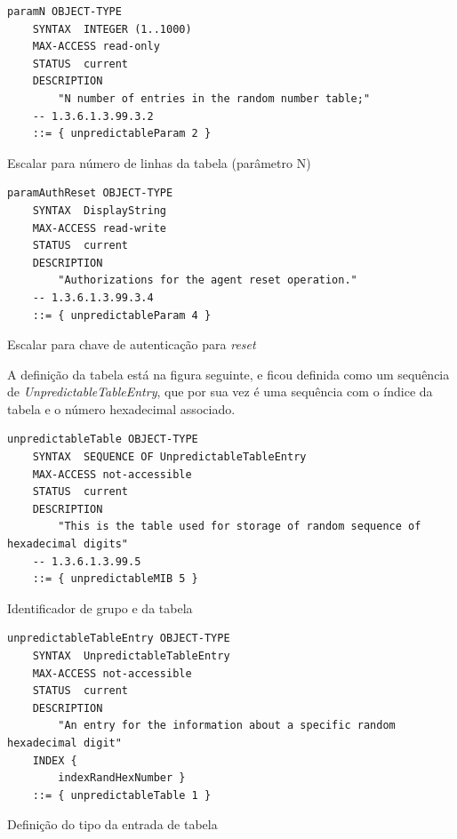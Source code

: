 \begin{center}
 	
\begin{verbatim}
paramN OBJECT-TYPE
	SYNTAX  INTEGER (1..1000)
	MAX-ACCESS read-only
	STATUS  current
	DESCRIPTION
		"N number of entries in the random number table;"
	-- 1.3.6.1.3.99.3.2
	::= { unpredictableParam 2 }

\end{verbatim}
 	\captionsetup{type=figure, width=0.8\linewidth}
	\caption{Escalar para número de linhas da tabela (parâmetro N)}
\label{fig:fasea:} 
\end{center}
\newpage
\begin{center}
 	
\begin{verbatim}
paramAuthReset OBJECT-TYPE
	SYNTAX  DisplayString
	MAX-ACCESS read-write
	STATUS  current
	DESCRIPTION
		"Authorizations for the agent reset operation."
	-- 1.3.6.1.3.99.3.4
	::= { unpredictableParam 4 }

\end{verbatim}
 	\captionsetup{type=figure, width=0.8\linewidth}
	\caption{Escalar para chave de autenticação para \emph{reset} }
\label{fig:fasea:} 
\end{center}

\newpage
A definição da tabela está na figura seguinte, e ficou definida como um
sequência de \emph{UnpredictableTableEntry}, que por sua vez é uma sequência
com o índice da tabela e o número hexadecimal associado. 

\begin{center}
 	
\begin{verbatim}
unpredictableTable OBJECT-TYPE
	SYNTAX  SEQUENCE OF UnpredictableTableEntry
	MAX-ACCESS not-accessible
	STATUS  current
	DESCRIPTION
		"This is the table used for storage of random sequence of hexadecimal digits"
	-- 1.3.6.1.3.99.5
	::= { unpredictableMIB 5 }
\end{verbatim}
 	\captionsetup{type=figure, width=0.8\linewidth}
	\caption{Identificador de grupo e da tabela}
\label{fig:fasea:} 
\end{center}

\begin{center}
 	
\begin{verbatim}
unpredictableTableEntry OBJECT-TYPE
	SYNTAX  UnpredictableTableEntry
	MAX-ACCESS not-accessible
	STATUS  current
	DESCRIPTION
		"An entry for the information about a specific random hexadecimal digit"
	INDEX {
		indexRandHexNumber }
	::= { unpredictableTable 1 }

\end{verbatim}
 	\captionsetup{type=figure, width=0.8\linewidth}
	\caption{Definição do tipo da entrada de tabela}
\label{fig:fasea:} 
\end{center}


